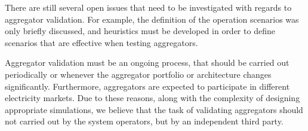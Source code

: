 There are still several open issues that need to be investigated with regards to aggregator validation. For example, the definition of the operation scenarios was only briefly discussed, and heuristics must be developed in order to define scenarios that are effective when testing aggregators.

Aggregator validation must be an ongoing process, that should be carried out periodically or whenever the aggregator portfolio or architecture changes significantly. Furthermore, aggregators are expected to participate in different electricity markets. Due to these reasons, along with the complexity of designing appropriate simulations, we believe that the task of validating aggregators should not carried out by the system operators, but by an independent third party. 